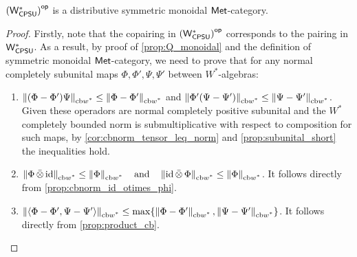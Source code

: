 \begin{theorem}
  $\left(\mathsf{W^*_{CPSU}}\right)^{\mathsf{op}}$ is a distributive symmetric monoidal $\mathsf{Met}$-category. 
\end{theorem}

\begin{proof}

  Firstly, note that the copairing in $\left(\mathsf{W^*_{CPSU}}\right)^{\mathsf{op}}$ corresponds to the pairing in $\mathsf{W^*_{CPSU}}$. As a result, by proof of \autoref{prop:Q_monoidal} and the definition of  symmetric monoidal $\mathsf{Met}$-category, we need to prove that for any normal completely subunital maps $\Phi,\Phi',\Psi,\Psi' $ between $W^*$-algebras:
  \begin{enumerate}
    \item $\left\lVert (\Phi - \Phi')\Psi \right\rVert_{\text{cb$w^*$}} \leq \left\lVert \Phi - \Phi' \right\rVert_{\text{cb$w^*$}}  $ and  $\left\lVert \Phi'(\Psi - \Psi') \right\rVert_{\text{cb$w^*$}} \leq \left\lVert \Psi - \Psi' \right\rVert_{\text{cb$w^*$}}$. 
     Given these operadors are normal completely positive subunital and the $W^*$ completely bounded norm is submultiplicative with respect to composition for such maps, by \autoref{cor:cbnorm_tensor_leq_norm} and \autoref{prop:subunital_short} the inequalities hold.
     \item $\left\lVert \Phi \,\bar{\otimes} \, \mathrm{id} \right\rVert_{\text{cb$w^*$}} \leq \left\lVert \Phi \right\rVert_{\text{cb$w^*$}} \quad \text{and} \quad  \left\lVert \mathrm{id}\,\bar{\otimes} \, \Phi \right\rVert_{\text{cb$w^*$}} \leq \left\lVert \Phi \right\rVert_{\text{cb$w^*$}}$. It follows directly from \autoref{prop:cbnorm_id_otimes_phi}.
     \item $\left\lVert \langle \Phi - \Phi' , \Psi- \Psi' \rangle \right\rVert_{\text{cb$w^*$}} \leq \max \{\left\lVert  \Phi - \Phi' \right\rVert_{\text{cb$w^*$}}, \left\lVert \Psi- \Psi' \right\rVert_{\text{cb$w^*$}}\}$. It follows directly from \autoref{prop:product_cb}.
  \end{enumerate}

\end{proof}

